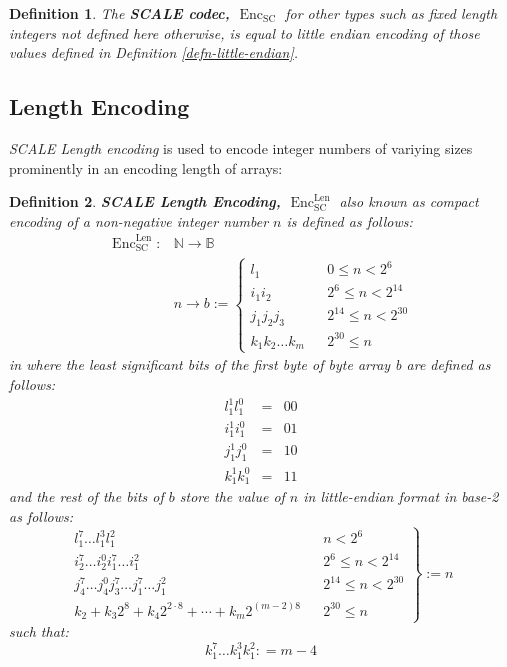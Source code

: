 \documentclass{book}
\newcommand{\assign}{:=}
\newcommand{\cdummy}{\cdot}
\newcommand{\nosymbol}{}
\newcommand{\tmem}[1]{{\em #1\/}}
\newcommand{\tmop}[1]{\ensuremath{\operatorname{#1}}}
\newcommand{\tmstrong}[1]{\textbf{#1}}
\newcommand{\tmtextbf}[1]{{\bfseries{#1}}}
\newcommand{\tmtextit}[1]{{\itshape{#1}}}
\newtheorem{definition}{Definition}
\providecommand{\cdummy}{{\cdot}}
\providecommand{\nosymbol}{}
\providecommand{\tmem}[1]{\tmtextit{#1}}
\providecommand{\tmop}[1]{\ensuremath{\mathrm{#1}}}
\providecommand{\tmstrong}[1]{\tmtextbf{#1}}
\providecommand{\tmtextbf}[1]{\tmtextbf{#1}}
\providecommand{\tmtextit}[1]{\tmtextit{#1}}
\newtheorem{definition}{Definition}
\begin{document}
\begin{definition}
  The {\tmstrong{SCALE codec, $\tmop{Enc}_{\tmop{SC}}$}} for other types such
  as fixed length integers not defined here otherwise, is equal to little
  endian encoding of those values defined in Definition
  \ref{defn-little-endian}. 
\end{definition}

\subsection{Length Encoding}\label{sect-int-encoding}

{\tmem{SCALE Length encoding}} is used to encode integer numbers of variying
sizes prominently in an encoding length of arrays:

\begin{definition}
  \label{defn-sc-len-encoding}{\tmstrong{SCALE Length Encoding,
  $\tmop{Enc}^{\tmop{Len}}_{\tmop{SC}}$}} also known as compact encoding of a
  non-negative integer number $n$ is defined as follows:
  \[ \begin{array}{ll}
       \tmop{Enc}^{\tmop{Len}}_{\tmop{SC}} : & \mathbb{N} \rightarrow
       \mathbb{B}\\
       & n \rightarrow b \assign \left\{ \begin{array}{lll}
         l^{\nosymbol}_1 &  & 0 \leqslant n < 2^6\\
         i^{\nosymbol}_1 i^{\nosymbol}_2 &  & 2^6 \leqslant n < 2^{14}\\
         j^{\nosymbol}_1 j^{\nosymbol}_2 j_3 &  & 2^{14} \leqslant n <
         2^{30}\\
         k_1^{\nosymbol} k_2^{\nosymbol} \ldots k_m^{\nosymbol}  &  & 2^{30}
         \leqslant n
       \end{array} \right.
     \end{array} \]
  in where the least significant bits of the first byte of byte array b are
  defined as follows:
  \[ \begin{array}{lcc}
       l^1_1 l_1^0 & = & 00\\
       i^1_1 i_1^0 & = & 01\\
       j^1_1 j_1^0 & = & 10\\
       k^1_1 k_1^0 & = & 11
     \end{array} \]
  and the rest of the bits of $b$ store the value of $n$ in little-endian
  format in base-2 as follows:
  \[ \left. \begin{array}{lll}
       l^7_1 \ldots l^3_1 l^2_1 &  & n < 2^6\\
       i_2^7 \ldots i_2^0 i_1^7 \ldots i^2_1^{\nosymbol} &  & 2^6 \leqslant n
       < 2^{14}\\
       j_4^7 \ldots j_4^0 j_3^7 \ldots j_1^7 \ldots j^2_1 &  & 2^{14}
       \leqslant n < 2^{30}\\
       k_2 + k_3 2^8 + k_4 2^{2 \cdummy 8} + \cdots + k_m 2^{(m - 2) 8} &  &
       2^{30} \leqslant n
     \end{array} \right\} \assign n \]
  such that:
  \[ k^7_1 \ldots k^3_1 k^2_1 : = m - 4 \]
\end{definition}
\end{document}
